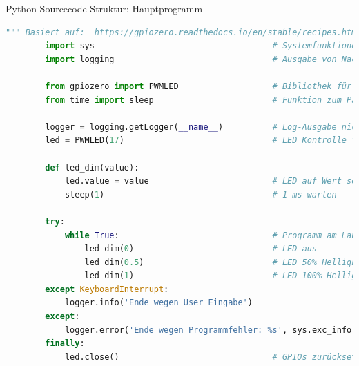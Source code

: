 \begin{frame}[fragile]{Python Sourcecode Struktur: Hauptprogramm}
    \begin{lstlisting}[language=Python, gobble=8]
        """ Basiert auf:  https://gpiozero.readthedocs.io/en/stable/recipes.html """
        import sys                                    # Systemfunktionen
        import logging                                # Ausgabe von Nachrichten

        from gpiozero import PWMLED                   # Bibliothek für PWM-Ansteuerung
        from time import sleep                        # Funktion zum Pausieren

        logger = logging.getLogger(__name__)          # Log-Ausgabe nicht mit print()
        led = PWMLED(17)                              # LED Kontrolle für GPIO PIN 17

        def led_dim(value):
            led.value = value                         # LED auf Wert setzen
            sleep(1)                                  # 1 ms warten

        try:
            while True:                               # Programm am Laufen halten
                led_dim(0)                            # LED aus
                led_dim(0.5)                          # LED 50% Helligkeit
                led_dim(1)                            # LED 100% Helligkeit
        except KeyboardInterrupt:
            logger.info('Ende wegen User Eingabe')
        except:
            logger.error('Ende wegen Programmfehler: %s', sys.exc_info()[0])
        finally:
            led.close()                               # GPIOs zurücksetzen
    \end{lstlisting}
\end{frame}

